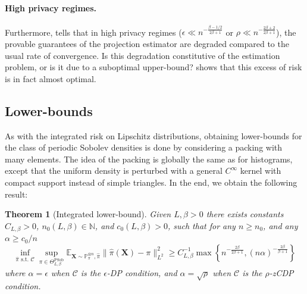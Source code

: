 \documentclass[10pt]{article} %
\newtheorem{theorem}{Theorem}
\newcommand{\N}[0]{\mathbb{N}}
\newcommand{\Prob}[0]{\mathbb{P}}
\newcommand{\E}[0]{\mathbb{E}}
\newcommand\vect[1]{\mathbf{#1}}
\newcommand\p[1]{\left( {#1}\right)}
\begin{document}
\paragraph{High privacy regimes.}

Furthermore,  tells that in high privacy regimes ($\epsilon \ll n^{- \frac{\beta - 1/2}{2 \beta + 1}}$ or $\rho \ll n^{- \frac{2\beta +2}{2 \beta + 1}}$), the provable guarantees of the projection estimator are degraded compared to the usual rate of convergence. Is this degradation constitutive of the estimation problem, or is it due to a suboptimal upper-bound?  shows that this excess of risk is in fact almost optimal.

\subsection{Lower-bounds}

\label{sec:lbsob}

As with the integrated risk on Lipschitz distributions, obtaining lower-bounds for the class of periodic Sobolev densities is done by considering a packing with many elements. The idea of the packing is globally the same as for histograms, except that the uniform density is perturbed with a general $C^\infty$ kernel with compact support instead of simple triangles. In the end, we obtain the following result:

\begin{theorem}[Integrated lower-bound]
\label{th:sidp}
Given $L,\beta>0$ there exists constants
$C_{L, \beta}>0$,
$n_0(L, \beta) \in \N$, and $c_0(L, \beta) > 0$, such that for any $n \geq n_0$, and any $\alpha \geq c_0/n$ %
\begin{equation*}
    \inf_{\hat{\pi} \text{ s.t. } \mathcal{C}} \sup_{\pi \in \Theta^{\text{PSob}}_{L, \beta}}
    \E_{\vect{X} \sim \Prob_{\pi}^{\otimes n}, \hat{\pi}}\|\hat{\pi}(\vect{X})- \pi\|_{L^2}^2 \geq  C_{L, \beta}^{-1} \max \left\{ n^{-\frac{2 \beta}{2 \beta + 1}}, (n \alpha)^{-\frac{2 \beta}{\beta + 1}} \right\}
\end{equation*}
where $\alpha=\epsilon$
when $\mathcal{C}$ is the $\epsilon$-DP condition, and 
$\alpha=\sqrt{\rho}$ when $\mathcal{C}$ is the $\rho$-zCDP condition.
\end{theorem}
\end{document}
